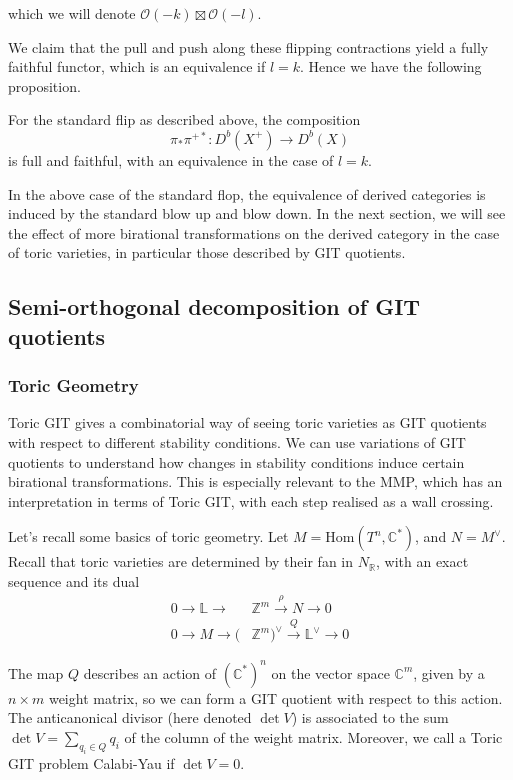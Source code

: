which we will denote $\mathcal{O}(-k) \boxtimes\mathcal{O}(-l)$. 

We claim that the pull and push along these flipping contractions yield a fully faithful functor, which is an equivalence if $l = k$. Hence we have the following proposition. 

\begin{theorem}{}{}
    For the standard flip as described above, the composition $$
\pi_{*}\pi^{+*}: D^{b}(X^+)\to D^{b}(X)
$$ is full and faithful, with an equivalence in the case of $l =k$. 
\end{theorem}

In the above case of the standard flop, the equivalence of derived categories is induced by the standard blow up and blow down. In the next section, we will see the effect of more birational transformations on the derived category in the case of toric varieties, in particular those described by GIT quotients. 

\subsection{Semi-orthogonal decomposition of GIT quotients}

\subsubsection{Toric Geometry}


Toric GIT gives a combinatorial way of seeing toric varieties as GIT quotients with respect to different stability conditions. We can use variations of GIT quotients to understand how changes in stability conditions induce certain birational transformations. This is especially relevant to the MMP, which has an interpretation in terms of Toric GIT, with each step realised as a wall crossing.

Let's recall some basics of toric geometry. Let $M = \mathrm{Hom}(T^{n}, \mathbb{C}^*)$, and $N = M^{\vee}$. Recall that toric varieties are determined by their fan in $N_\mathbb{R}$, with an exact sequence and its dual
\begin{align*}
0 \to \mathbb{L}\to &\mathbb{Z}^{m}\xrightarrow{\rho}N \to 0 \\
0 \to M \to (&\mathbb{Z}^{m})^{\vee} \xrightarrow{Q} \mathbb{L}^{\vee}\to {0}
\end{align*}

The map $Q$ describes an action of $(\mathbb{C}^{*})^n$ on the vector space $\mathbb{C}^m$, given by a $n\times m$ weight matrix, so we can form a GIT quotient with respect to this action.  The anticanonical divisor (here denoted $\det V$) is associated to the sum $\det V = \sum_{q_{i}\in Q}q_i$ of the column of the weight matrix. Moreover, we call a Toric GIT problem Calabi-Yau if $\det V = 0$.  

